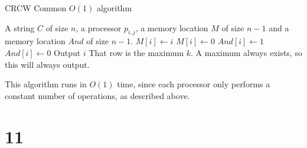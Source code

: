 \documentclass[letterpaper,notitlepage,twoside]{article}
\begin{document}
\begin{algorithm}
    \begin{algorithmic}%
        \caption{CRCW Common $O(1)$ algorithm}
        \Require A string $C$ of size $n$, a processor $p_{i, j}$, a memory location $M$ of size $n - 1$ and a memory location $And$ of size $n - 1$.
        \State $M[i] \gets i$ 
            \State $M[i] \gets 0$ 
        \EndIf
        \State $And[i] \gets 1$ 
         
            \State $And[i] \gets 0$ 
        \EndIf
            \State Output $i$ \Comment That row is the maximum $k$. A maximum always exists, so this will always output.
        \EndIf
    \end{algorithmic}
\end{algorithm}

This algorithm runs in $O(1)$ time, since each processor only performs a constant number of operations, as described above.

\section*{11}
\end{document}
